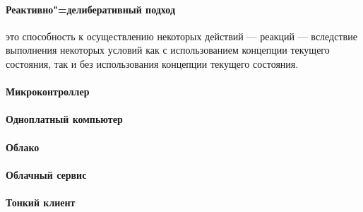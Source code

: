 \paragraph*{Реактивно"=делиберативный подход} это способность к осуществлению некоторых действий --- реакций --- вследствие выполнения некоторых условий как с использованием концепции текущего состояния, так и без использования концепции текущего состояния.

\paragraph*{Микроконтроллер}

\paragraph*{Одноплатный компьютер}

\paragraph*{Облако}

\paragraph*{Облачный сервис}

\paragraph*{Тонкий клиент}
